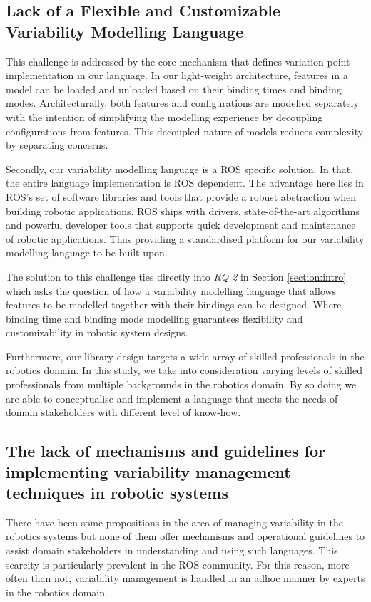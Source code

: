 \documentclass[conference]{IEEEtran}
\begin{document}
\subsection{Lack of a Flexible and Customizable Variability Modelling Language}
This challenge is addressed by the core mechanism that defines variation point implementation in our language. In our light-weight architecture, features in a model can be loaded and unloaded based on their binding times and binding modes. Architecturally, both features and configurations are modelled separately with the intention of simplifying the modelling experience by decoupling configurations from features. This decoupled nature of models reduces complexity by separating concerns.

Secondly, our variability modelling language is a ROS specific solution. In that, the entire language implementation is ROS dependent. The advantage here lies in ROS's set of software libraries and tools that provide a robust abstraction when building robotic applications. ROS ships with drivers, state-of-the-art algorithms and powerful developer tools that supports quick development and maintenance of robotic applications. Thus providing a standardised platform for our variability modelling language to be built upon.

The solution to this challenge ties directly into \textit{RQ 2} in Section \ref{section:intro} which asks the question of how a variability modelling language that allows features to be modelled together with their bindings can be designed. Where binding time and binding mode modelling guarantees flexibility and customizability in robotic system designs.

Furthermore, our library design targets a wide array of skilled professionals in the robotics domain. In this study, we take into consideration varying levels of skilled professionals from multiple backgrounds in the robotics domain. By so doing we are able to conceptualise and implement a language that meets the needs of domain stakeholders with different level of know-how.

\subsection{The lack of mechanisms and guidelines for implementing variability management techniques in robotic systems}
There have been some propositions in the area of managing variability in the robotics systems but none of them offer mechanisms and operational guidelines to assist domain stakeholders in understanding and using such languages. This scarcity is particularly prevalent in the ROS community. For this reason, more often than not, variability management is handled in an adhoc manner by experts in the robotics domain.
\end{document}
